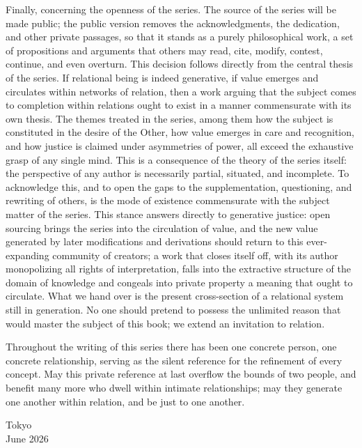 Finally, concerning the openness of the series. The source of the series will be made public; the public version removes the acknowledgments, the dedication, and other private passages, so that it stands as a purely philosophical work, a set of propositions and arguments that others may read, cite, modify, contest, continue, and even overturn. This decision follows directly from the central thesis of the series. If relational being is indeed generative, if value emerges and circulates within networks of relation, then a work arguing that the subject comes to completion within relations ought to exist in a manner commensurate with its own thesis. The themes treated in the series, among them how the subject is constituted in the desire of the Other, how value emerges in care and recognition, and how justice is claimed under asymmetries of power, all exceed the exhaustive grasp of any single mind. This is a consequence of the theory of the series itself: the perspective of any author is necessarily partial, situated, and incomplete. To acknowledge this, and to open the gaps to the supplementation, questioning, and rewriting of others, is the mode of existence commensurate with the subject matter of the series. This stance answers directly to generative justice: open sourcing brings the series into the circulation of value, and the new value generated by later modifications and derivations should return to this ever-expanding community of creators; a work that closes itself off, with its author monopolizing all rights of interpretation, falls into the extractive structure of the domain of knowledge and congeals into private property a meaning that ought to circulate. What we hand over is the present cross-section of a relational system still in generation. No one should pretend to possess the unlimited reason that would master the subject of this book; we extend an invitation to relation.

Throughout the writing of this series there has been one concrete person, one concrete relationship, serving as the silent reference for the refinement of every concept. May this private reference at last overflow the bounds of two people, and benefit many more who dwell within intimate relationships; may they generate one another within relation, and be just to one another.

\begin{flushright}
Tokyo\\
June 2026
\end{flushright}
